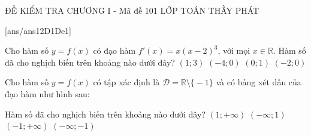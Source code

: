 \begin{name}
	{\tenchude}
	{ĐỀ KIỂM TRA CHƯƠNG I - Mã đề 101}
	{LỚP TOÁN THẦY PHÁT}
	{\thoigian}
\end{name}
\TN
{}[ans/ans12D1De1]
\begin{ex}%
 Cho hàm số $y=f(x)$ có đạo hàm $f'(x)=x(x-2)^3$, với mọi $x \in \mathbb{R}$. Hàm số đã cho nghịch biến trên khoảng nào dưới đây?
 \choice 
 {$(1;3)$}
 {$(-4;0)$}
 {\True $(0;1)$}
 {$(-2;0)$}
\end{ex}

\begin{ex}%
 Cho hàm số $y=f(x)$ có tập xác định là $\mathscr{D}=\mathbb{R}\setminus\big\{-1\big\}$ và có bảng xét dấu của đạo hàm như hình sau:
 \begin{center}
 \end{center}
 Hàm số đã cho nghịch biến trên khoảng nào dưới đây? 
 \choice 
 {$(1 ;+\infty)$}
 {$(-\infty; 1)$}
 {$(-1;+\infty)$}
 {\True $(-\infty;-1)$}
\end{ex}

